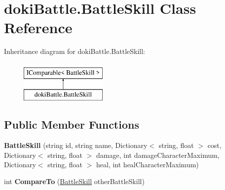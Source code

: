 \hypertarget{classdoki_battle_1_1_battle_skill}{}\section{doki\+Battle.\+Battle\+Skill Class Reference}
\label{classdoki_battle_1_1_battle_skill}
Inheritance diagram for doki\+Battle.\+Battle\+Skill\+:\begin{figure}[H]
\begin{center}
\leavevmode
\includegraphics[height=2.000000cm]{classdoki_battle_1_1_battle_skill}
\end{center}
\end{figure}
\subsection*{Public Member Functions}
\begin{DoxyCompactItemize}
\item 
{\bfseries Battle\+Skill} (string id, string name, Dictionary$<$ string, float $>$ cost, Dictionary$<$ string, float $>$ damage, int damage\+Character\+Maximum, Dictionary$<$ string, float $>$ heal, int heal\+Character\+Maximum)\hypertarget{classdoki_battle_1_1_battle_skill_a0ca39c0762c6472553c9af6ddc150af3}{}\label{classdoki_battle_1_1_battle_skill_a0ca39c0762c6472553c9af6ddc150af3}

\item 
int {\bfseries Compare\+To} (\hyperlink{classdoki_battle_1_1_battle_skill}{Battle\+Skill} other\+Battle\+Skill)\hypertarget{classdoki_battle_1_1_battle_skill_aee3c57de41304a804b124e9f1debba12}{}\label{classdoki_battle_1_1_battle_skill_aee3c57de41304a804b124e9f1debba12}

\end{DoxyCompactItemize}
